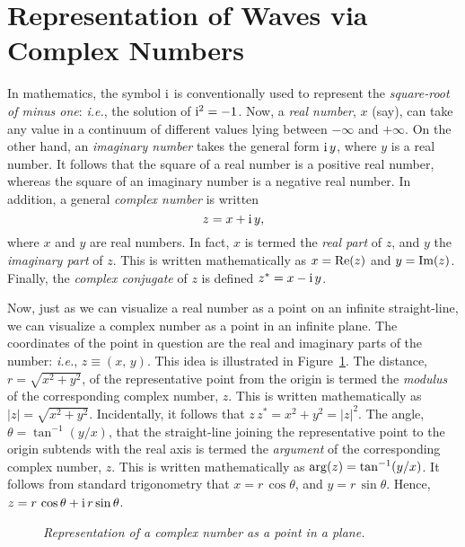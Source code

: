 \section{Representation of Waves via Complex Numbers}
In mathematics, the symbol ${\rm i}$ is conventionally used to represent the {\em square-root of minus one}: {\em i.e.}, the
solution of ${\rm i}^2 = -1$. Now, a {\em real number}, $x$ (say), can take any value in a continuum of different values lying between $-\infty$ and $+\infty$. 
On the other hand, an {\em imaginary number}\/ takes the general form ${\rm i}\,y$, where $y$ is a real number. It follows that the square of
a real number is a positive real number, whereas the square of an imaginary number is a negative real number. In addition, a general {\em complex number}\/ is written
\begin{equation}
z = x + {\rm i}\,y,
\end{equation}
where $x$ and $y$ are real numbers. In fact, $x$ is termed the {\em real part}\/ of $z$, and $y$ 
the {\em imaginary part}\/ of $z$. This is written mathematically as $x={\rm Re}(z)$ and $y={\rm Im}(z)$. 
Finally, the {\em complex conjugate}\/ of $z$ is defined $z^\ast = x-{\rm i}\,y$.

Now, just as we
can visualize a real number as a point on an infinite straight-line, we can visualize a complex number as
a point in an infinite plane. The coordinates of the point in question are the real and imaginary
parts of the number: {\em i.e.}, $z\equiv (x,\,y)$. This idea is illustrated in Figure~\ref{f13.2}. 
The distance, $r=\sqrt{x^2+y^2}$, of the representative point from the origin is termed the {\em modulus}\/
of the corresponding complex number, $z$. This is written mathematically as $|z|=\sqrt{x^2+y^2}$.  Incidentally, it follows that $z\,z^\ast = x^2 + y^2=|z|^2$. 
The angle, $\theta=\tan^{-1}(y/x)$,  that the straight-line joining the representative point to the origin subtends with the 
real axis is termed the {\em argument}\/ of the corresponding complex number, $z$. This is written mathematically
as ${\rm arg}(z)=\tan^{-1}(y/x)$. It follows from standard trigonometry that $x=r\,\cos\theta$, and $y=r\,\sin\theta$.
Hence, $z= r\,\cos\theta+ {\rm i}\,r\sin\theta$. 

\begin{figure}
\epsfysize=3.25in
\centerline{}
\caption{\em Representation of a complex number as a point in a plane.}\label{f13.2}   
\end{figure}

